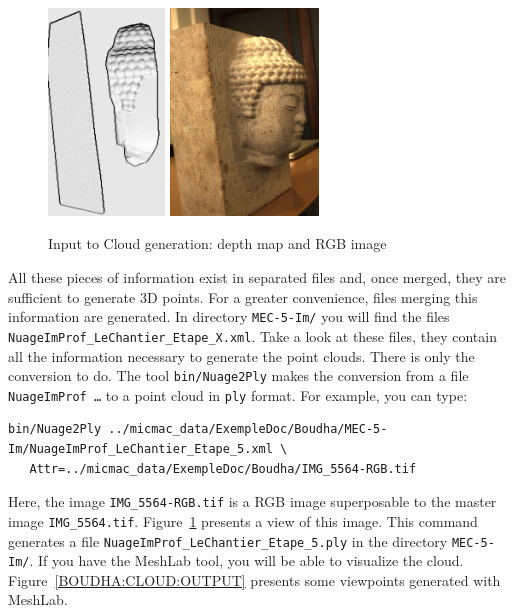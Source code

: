 \begin{figure}
\begin{center}
\includegraphics[height=55mm]{FIGS/Boudhas/FACE-Shade.jpg}
\includegraphics[height=55mm]{FIGS/Boudhas/IMG_5564-RGB.jpg}
\caption{Input to Cloud generation: depth map and RGB image}
\label{BOUDHA:CLOUD:INPUT}
\end{center}
\end{figure}


All these pieces of information exist in separated files and, once merged, they are sufficient
to generate 3D points. For a greater convenience, files merging
this information are generated. In directory {\tt MEC-5-Im/}
you will find the files {\tt NuageImProf\_LeChantier\_Etape\_X.xml}.
Take a look at these files, they contain all the information
necessary to generate  the point clouds. There is only the conversion to do.
The tool {\tt bin/Nuage2Ply} makes the conversion from
a file {\tt NuageImProf \dots} to a point cloud in {\tt ply} format.
For example, you can type:

\begin{verbatim}
bin/Nuage2Ply ../micmac_data/ExempleDoc/Boudha/MEC-5-Im/NuageImProf_LeChantier_Etape_5.xml \
   Attr=../micmac_data/ExempleDoc/Boudha/IMG_5564-RGB.tif

\end{verbatim}

Here, the image {\tt IMG\_5564-RGB.tif} is a RGB image superposable to the master image
{\tt IMG\_5564.tif}. Figure~\ref{BOUDHA:CLOUD:INPUT} presents a view of this image. This
command generates a file  {\tt NuageImProf\_LeChantier\_Etape\_5.ply} in the directory {\tt MEC-5-Im/}.
If you have the MeshLab tool, you will be able to visualize the cloud. Figure~\ref{BOUDHA:CLOUD:OUTPUT}
presents  some  viewpoints generated with MeshLab.



